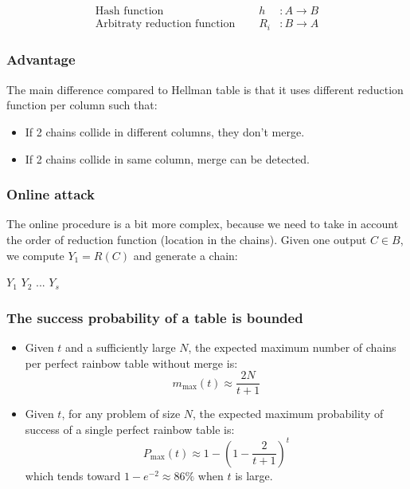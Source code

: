 \begin{eqnarray*}
    \textrm{Hash function } \quad & h &: A \to B \\
    \textrm{Arbitraty reduction function } \quad & R_i &: B \to A 
\end{eqnarray*}

\subsubsection{Advantage}
The main difference compared to
Hellman table is that it uses different reduction function per column such that:
\begin{itemize}
    \item If 2 chains collide in different columns, they don't merge.
    \item If 2 chains collide in same column, merge can be detected.
\end{itemize}

\subsubsection{Online attack}
The online procedure is a bit more complex, because we need to take in
account the order of reduction function (location in the chains).
Given one output $C \in B$, we compute $Y_1 = R(C)$ and generate a
chain: 
\begin{center}
    $Y_1$  $Y_2$  ...  $Y_s $
\end{center}


\subsubsection{The success probability of a table is bounded}
\begin{itemize}
    \item
        Given $t$ and a sufficiently large $N$, the expected maximum number of
        chains per perfect rainbow table without merge is:
        $$ m_{\max}(t)\approx\frac{2N}{t+1} $$
    \item
        Given $t$, for any problem of size $N$, the expected maximum probability of
        success of a single perfect rainbow table is:
        $$ P_{\max}(t)\approx 1 - (1-\frac{2}{t+1})^t $$
        which tends toward $ 1 - e^{-2}\approx 86\% $ when $t$ is large.

\end{itemize}

